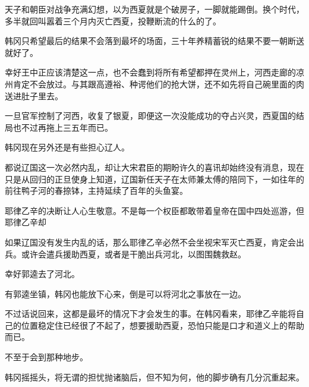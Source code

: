 天子和朝臣对战争充满幻想，以为西夏就是个破房子，一脚就能踢倒。换个时代，多半就回叫嚣着三个月内灭亡西夏，投鞭断流的什么的了。

韩冈只希望最后的结果不会落到最坏的场面，三十年养精蓄锐的结果不要一朝断送就好了。

幸好王中正应该清楚这一点，也不会蠢到将所有希望都押在灵州上，河西走廊的凉州肯定不会放过。与其跟高遵裕、种谔他们的抢大饼，还不如先将自己碗里面的肉送进肚子里去。

一旦官军控制了河西，收复了银夏，即便这一次没能成功的夺占兴灵，西夏国的结局也不过再拖上三五年而已。

韩冈现在另外还是有些担心辽人。

都说辽国这一次必然内乱，却让大宋君臣的期盼许久的喜讯却始终没有消息，现在只是从回归的正旦使身上知道，辽国新任天子在太师兼太傅的陪同下，一如往年的前往鸭子河的春捺钵，主持延续了百年的头鱼宴。

耶律乙辛的决断让人心生敬意。不是每一个权臣都敢带着皇帝在国中四处巡游，但耶律乙辛却

如果辽国没有发生内乱的话，那么耶律乙辛必然不会坐视宋军灭亡西夏，肯定会出兵。或许会遣兵援助西夏，或者是干脆出兵河北，以图围魏救赵。

幸好郭逵去了河北。

有郭逵坐镇，韩冈也能放下心来，倒是可以将河北之事放在一边。

不过话说回来，这都是最坏的情况下才会发生的事。在韩冈看来，耶律乙辛能将自己的位置稳定住已经很了不起了，想要援助西夏，恐怕只能是口才和道义上的帮助而已。

不至于会到那种地步。

韩冈摇摇头，将无谓的担忧抛诸脑后，但不知为何，他的脚步确有几分沉重起来。

